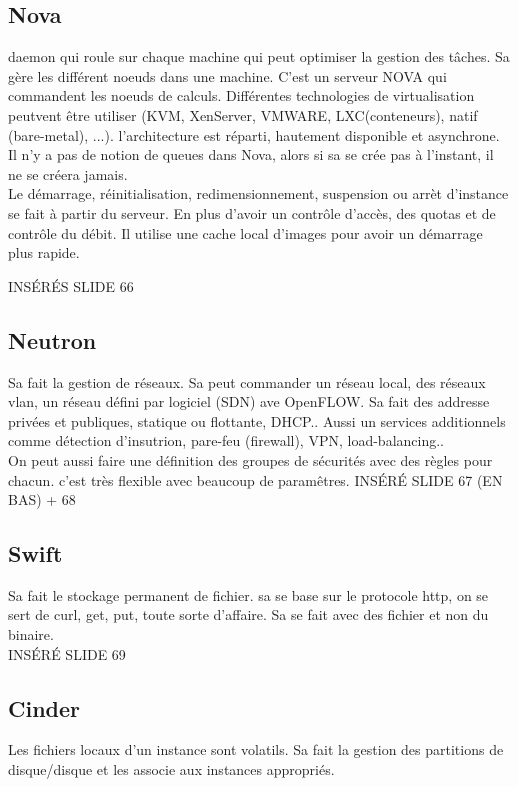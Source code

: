\documentclass[oneside]{book}
\begin{document}
\subsection{Nova}
daemon qui roule sur chaque machine qui peut optimiser la gestion des tâches. Sa gère les différent noeuds dans une machine. C'est un serveur NOVA qui commandent les noeuds de calculs. Différentes technologies de virtualisation peutvent être utiliser (KVM, XenServer, VMWARE, LXC(conteneurs), natif (bare-metal), ...). l'architecture est réparti, hautement disponible et asynchrone. Il n'y a pas de notion de queues dans Nova, alors si sa se crée pas à l'instant, il ne se créera jamais.\\

Le démarrage, réinitialisation, redimensionnement, suspension ou arrèt d'instance se fait à partir du serveur. En plus d'avoir un contrôle d'accès, des quotas et de contrôle du débit. Il utilise une cache local d'images pour avoir un démarrage plus rapide.

INSÉRÉS SLIDE 66
\subsection{Neutron}
Sa fait la gestion de réseaux. Sa peut commander un réseau local, des réseaux vlan, un réseau défini par logiciel (SDN) ave OpenFLOW. Sa fait des addresse privées et publiques, statique ou flottante, DHCP.. Aussi un services additionnels comme détection d'insutrion, pare-feu (firewall), VPN, load-balancing..\\

On peut aussi faire une définition des groupes de sécurités avec des règles pour chacun. c'est très flexible avec beaucoup de paramêtres.
INSÉRÉ  SLIDE 67  (EN BAS) + 68
\subsection{Swift}
Sa fait le stockage permanent de fichier. sa se base sur le protocole http, on se sert de curl, get, put, toute sorte d'affaire. Sa se fait avec des fichier et non du binaire.\\

INSÉRÉ SLIDE 69
\subsection{Cinder}
Les fichiers locaux d'un instance sont volatils. Sa fait la gestion des partitions de disque/disque et les associe aux instances appropriés. 
\end{document}
